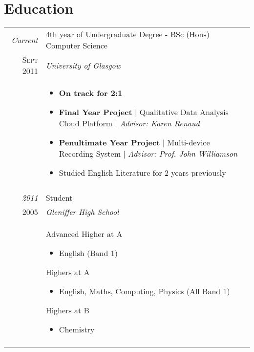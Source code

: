 \documentclass[a4paper,10pt]{article}
\begin{document}
\section{Education}
\begin{tabular}{r|p{11cm}}
 \emph{Current} & 4th year of Undergraduate Degree - BSc (Hons) Computer Science \\\textsc{Sept 2011}&\emph{University of Glasgow}\\&\footnotesize{ \begin{itemize}
 \item \textbf{On track for 2:1}
 \item \textbf{Final Year Project} | Qualitative Data Analysis Cloud Platform |  \textit{ Advisor: Karen Renaud}
 \item \textbf{Penultimate Year Project} | Multi-device Recording System | \textit{Advisor: Prof. John Williamson}
 \item Studied English Literature for 2 years previously
 \end{itemize}}\\\multicolumn{2}{c}{} \\
 \emph{2011} & Student \\\textsc{2005}&\emph{Gleniffer High School}\\&\footnotesize{Advanced Higher at A 
            \begin{itemize}
                \item English (Band 1)
            \end{itemize}
    \par Highers at A 
            \begin{itemize}
                \item English, Maths, Computing, Physics (All Band 1)
            \end{itemize}
    \par Highers at B
            \begin{itemize}
                \item Chemistry
            \end{itemize}}\\
    \multicolumn{2}{c}{} \\

\end{tabular}


\end{document}
